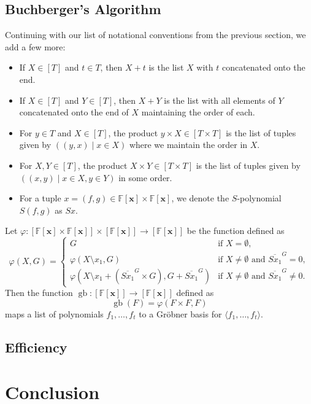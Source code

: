 \documentclass[MS, xcolor=dvipsnames]{wfuthesis}
\def\bF{\mathbb{F}}
\DeclareMathOperator{\gb}{gb}
\def\and{\text{ and }}
\theoremstyle{definition}
\def\p{\varphi}
\begin{document}
\section{Buchberger's Algorithm}
Continuing with our list of notational conventions from the previous section, we add a few more:
\begin{itemize}
  \item If $X \in [T]$ and $t \in T$, then $X + t$ is the list $X$ with $t$ concatenated onto the end. 
  \item If $X \in [T]$ and $Y \in [T]$, then $X + Y$ is the list with all elements of $Y$ concatenated onto the end of $X$ maintaining the order of each. 
  \item For $y \in T$ and $X \in [T]$, the product $y \times X \in [T \times T]$ is the list of tuples given by $((y,x) \mid x \in X)$ where we maintain the order in $X$. 
  \item For $X,Y \in [T]$, the product $X \times Y \in [T \times T]$ is the list of tuples given by $((x,y) \mid x \in X, y \in Y)$ in some order. 
  \item For a tuple $x = (f,g) \in \bF[\mathbf x] \times \bF[\mathbf x]$, we denote the $S$-polynomial $S(f,g)$ as $Sx$. 
\end{itemize}
Let $\p: [\bF[\mathbf x] \times \bF[\mathbf x]] \times [\bF[\mathbf x]] \to [\bF[\mathbf x]]$ be the function defined as 
\[ \p(X,G) = \begin{cases} G &\text{if } X = \emptyset, \\ \p(X \setminus x_1,G) &\text{if } X \ne \emptyset \and \overline{Sx_1}^{G} = 0, \\ \p\left(X \setminus x_1 + (\overline{Sx_1}^{G} \times G),G + \overline{Sx_1}^{G}\right) &\text{if } X \ne \emptyset \and \overline{Sx_1}^{G} \ne 0. \end{cases} \]
Then the function $\gb: [\bF[\mathbf x]] \to [\bF[\mathbf x]]$ defined as
\[ \gb(F) = \p(F \times F,F) \]
maps a list of polynomials $f_1,\dots,f_t$ to a Gr\"obner basis for $\langle f_1,\dots,f_t \rangle$.

\section{Efficiency}

\chapter{Conclusion}





\end{document}
